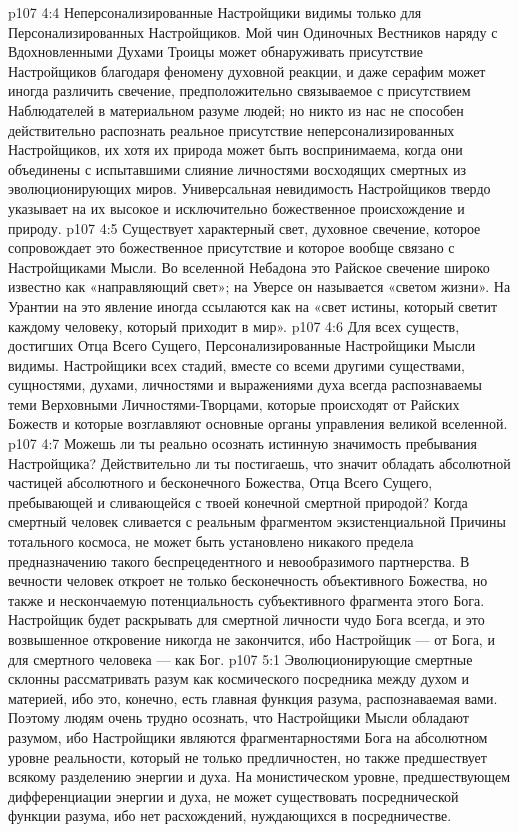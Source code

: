 \vs p107 4:4 \pc Неперсонализированные Настройщики видимы только для Персонализированных Настройщиков. Мой чин Одиночных Вестников наряду с Вдохновленными Духами Троицы может обнаруживать присутствие Настройщиков благодаря феномену духовной реакции, и даже серафим может иногда различить свечение, предположительно связываемое с присутствием Наблюдателей в материальном разуме людей; но никто из нас не способен действительно распознать реальное присутствие неперсонализированных Настройщиков, их хотя их природа может быть воспринимаема, когда они объединены с испытавшими слияние личностями восходящих смертных из эволюционирующих миров. Универсальная невидимость Настройщиков твердо указывает на их высокое и исключительно божественное происхождение и природу.
\vs p107 4:5 Существует характерный свет, духовное свечение, которое сопровождает это божественное присутствие и которое вообще связано с Настройщиками Мысли. Во вселенной Небадона это Райское свечение широко известно как «направляющий свет»; на Уверсе он называется «светом жизни». На Урантии на это явление иногда ссылаются как на «свет истины, который светит каждому человеку, который приходит в мир».
\vs p107 4:6 Для всех существ, достигших Отца Всего Сущего, Персонализированные Настройщики Мысли видимы. Настройщики всех стадий, вместе со всеми другими существами, сущностями, духами, личностями и выражениями духа всегда распознаваемы теми Верховными Личностями\hyp{}Творцами, которые происходят от Райских Божеств и которые возглавляют основные органы управления великой вселенной.
\vs p107 4:7 \pc Можешь ли ты реально осознать истинную значимость пребывания Настройщика? Действительно ли ты постигаешь, что значит обладать абсолютной частицей абсолютного и бесконечного Божества, Отца Всего Сущего, пребывающей и сливающейся с твоей конечной смертной природой? Когда смертный человек сливается с реальным фрагментом экзистенциальной Причины тотального космоса, не может быть установлено никакого предела предназначению такого беспрецедентного и невообразимого партнерства. В вечности человек откроет не только бесконечность объективного Божества, но также и нескончаемую потенциальность субъективного фрагмента этого Бога. Настройщик будет раскрывать для смертной личности чудо Бога всегда, и это возвышенное откровение никогда не закончится, ибо Настройщик --- от Бога, и для смертного человека --- как Бог.
\vs p107 5:1 Эволюционирующие смертные склонны рассматривать разум как космического посредника между духом и материей, ибо это, конечно, есть главная функция разума, распознаваемая вами. Поэтому людям очень трудно осознать, что Настройщики Мысли обладают разумом, ибо Настройщики являются фрагментарностями Бога на абсолютном уровне реальности, который не только предличностен, но также предшествует всякому разделению энергии и духа. На монистическом уровне, предшествующем дифференциации энергии и духа, не может существовать посреднической функции разума, ибо нет расхождений, нуждающихся в посредничестве.
